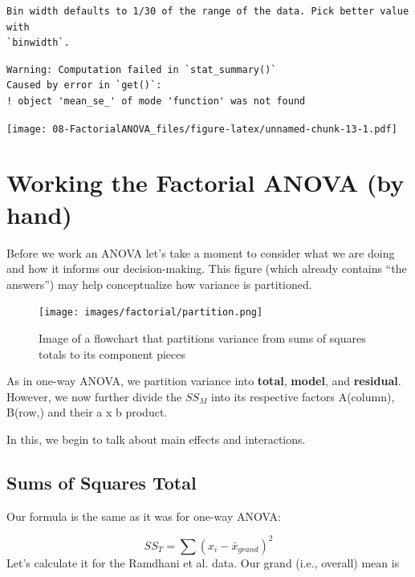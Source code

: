 \documentclass[
  11pt,
]{book}
\newenvironment{Shaded}{\begin{snugshade}}{\end{snugshade}}
\newcommand{\FunctionTok}[1]{\textcolor[rgb]{0.27,0.27,0.27}{\textbf{#1}}}
\newcommand{\NormalTok}[1]{#1}
\newcommand{\SpecialCharTok}[1]{\textcolor[rgb]{0.43,0.43,0.43}{\textbf{#1}}}
\begin{document}
\begin{verbatim}
Bin width defaults to 1/30 of the range of the data. Pick better value with
`binwidth`.
\end{verbatim}

\begin{verbatim}
Warning: Computation failed in `stat_summary()`
Caused by error in `get()`:
! object 'mean_se_' of mode 'function' was not found
\end{verbatim}

\texttt{[image: 08-FactorialANOVA\_files/figure-latex/unnamed-chunk-13-1.pdf]}

\hypertarget{working-the-factorial-anova-by-hand}{%
\section{Working the Factorial ANOVA (by hand)}\label{working-the-factorial-anova-by-hand}}

Before we work an ANOVA let's take a moment to consider what we are doing and how it informs our decision-making. This figure (which already contains ``the answers'') may help conceptualize how variance is partitioned.

\begin{figure}
\centering
\texttt{[image: images/factorial/partition.png]}
\caption{Image of a flowchart that partitions variance from sums of squares totals to its component pieces}
\end{figure}

As in one-way ANOVA, we partition variance into \textbf{total}, \textbf{model}, and \textbf{residual}. However, we now further divide the \(SS_M\) into its respective factors A(column), B(row,) and their a x b product.

In this, we begin to talk about main effects and interactions.

\hypertarget{sums-of-squares-total-1}{%
\subsection{Sums of Squares Total}\label{sums-of-squares-total-1}}

Our formula is the same as it was for one-way ANOVA:

\[SS_{T}= \sum (x_{i}-\bar{x}_{grand})^{2}\] Let's calculate it for the Ramdhani et al. \citeyearpar{ramdhani_affective_2018} data. Our grand (i.e., overall) mean is

\begin{Shaded}
\end{Shaded}
\end{document}
